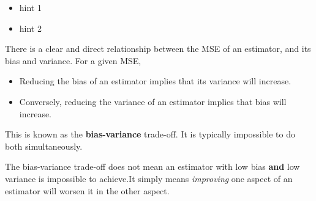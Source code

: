 \documentclass[
]{book}
\providecommand{\tightlist}{%
  \setlength{\itemsep}{0pt}\setlength{\parskip}{0pt}}
\theoremstyle{definition}
\theoremstyle{definition}
\theoremstyle{definition}
\theoremstyle{definition}
\theoremstyle{remark}
\begin{document}
\begin{itemize}
\tightlist
\item
  hint 1
\item
  hint 2
\end{itemize}

There is a clear and direct relationship between the MSE of an estimator, and its bias and variance. For a given MSE,

\begin{itemize}
\item
  Reducing the bias of an estimator implies that its variance will increase.
\item
  Conversely, reducing the variance of an estimator implies that bias will increase.
\end{itemize}

This is known as the \textbf{bias-variance} trade-off. It is typically impossible to do both simultaneously.

The bias-variance trade-off does not mean an estimator with low bias \textbf{and} low variance is impossible to achieve.It simply means \emph{improving} one aspect of an estimator will worsen it in the other aspect.
\end{document}
